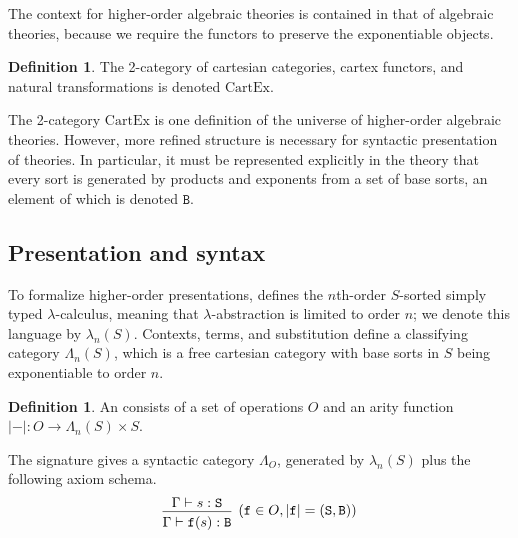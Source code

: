 \documentclass[12pt]{article}
\theoremstyle{definition}
\newtheorem{definition}[theorem]{Definition}
\newcommand{\define}[1]{{\bf \boldmath{#1}}}
\newcommand{\mrm}[1]{\mathrm{#1}}
\newcommand{\mtt}[1]{\mathtt{#1}}
\newcommand{\CartEx}{\mrm{CartEx}}
\newcommand{\tts}{\mtt{S}}
\newcommand{\ttB}{\mtt{B}}
\newcommand{\ttf}{\mtt{f}}
\begin{document}
The context for higher-order algebraic theories is contained in that of algebraic theories, because we require the functors to preserve the exponentiable objects.

\begin{definition}
    The 2-category of cartesian categories, cartex functors, and natural transformations is denoted $\CartEx$. 
    
\end{definition}

The 2-category $\CartEx$ is one definition of the universe of higher-order algebraic theories. However, more refined structure is necessary for syntactic presentation of theories. In particular, it must be represented explicitly in the theory that every sort is generated by products and exponents from a set of base sorts, an element of which is denoted $\ttB$.

\subsection{Presentation and syntax}

To formalize higher-order presentations, \cite[A1]{hoat} defines the $n$th-order $S$-sorted simply typed $\lambda$-calculus, meaning that $\lambda$-abstraction is limited to order $n$; we denote this language by $\lambda_n(S)$. Contexts, terms, and substitution define a classifying category $\Lambda_n(S)$, which is a free cartesian category with base sorts in $S$ being exponentiable to order $n$.

\begin{definition}
    An \define{$n$th-order $S$-sorted signature} consists of a set of operations $O$ and an arity function $\lvert -\rvert:O\to \Lambda_n(S)\times S$.
    
    The signature gives a syntactic category $\Lambda_O$, generated by $\lambda_n(S)$ plus the following axiom schema.
    \[\begin{prooftree}
        \hypo{\Gamma \vdash s:\tts}
        \infer1[$(\ttf \in O, \lvert \ttf\rvert = (\tts,\ttB))$]{\Gamma \vdash \ttf(s):\ttB}
    \end{prooftree}\]
\end{definition}
\end{document}
